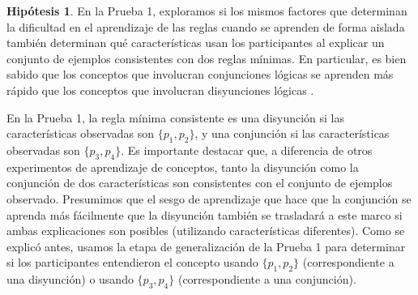 \theoremstyle{definition}
\newtheorem{hyp}{Hipótesis}
\renewcommand\thehyp{\Roman{hyp}}
 

\begin{hyp}\label{Hip:AndOverOr} 
En la Prueba 1, exploramos si los mismos factores que determinan la dificultad en el aprendizaje de las reglas cuando se aprenden de forma aislada también determinan qué características usan los participantes al explicar un conjunto de ejemplos consistentes con dos reglas mínimas. En particular, es bien sabido que los conceptos que involucran conjunciones lógicas se aprenden más rápido que los conceptos que involucran disyunciones lógicas \cite{bourne1970knowing}.

En la Prueba 1, la regla mínima consistente es una disyunción si las características observadas son $\{p_1, p_2 \}$, y una conjunción si las características observadas son $\{p_3, p_4 \}$. Es importante destacar que, a diferencia de otros experimentos de aprendizaje de conceptos, tanto la disyunción como la conjunción de dos características son consistentes con el conjunto de ejemplos observado. Presumimos que el sesgo de aprendizaje que hace que la conjunción se aprenda más fácilmente que la disyunción también se trasladará a este marco si ambas explicaciones son posibles (utilizando características diferentes). Como se explicó antes, usamos la etapa de generalización de la Prueba 1 para determinar si los participantes entendieron el concepto usando $\{p_1, p_2 \}$ (correspondiente a una disyunción) o usando $\{p_3, p_4 \} $ (correspondiente a una conjunción).


\end{hyp}
